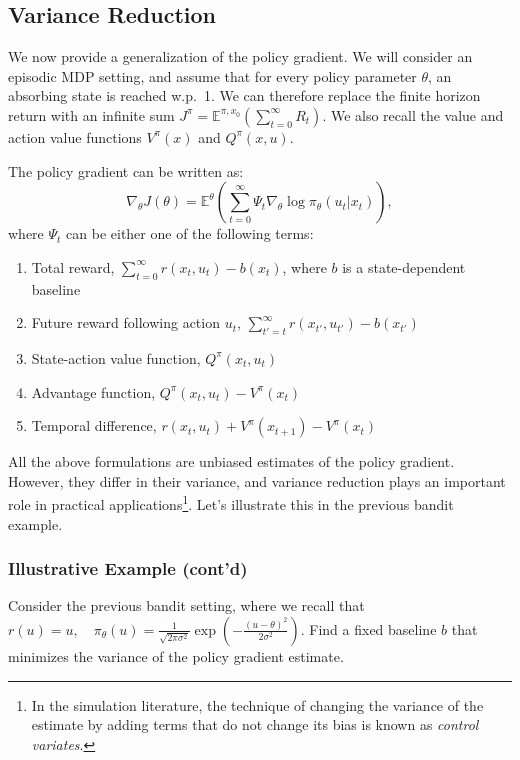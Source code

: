 \subsection{Variance Reduction}
We now provide a generalization of the policy gradient. We will consider an episodic MDP setting, and assume that for every policy parameter $\theta$, an absorbing state is reached w.p.~1. We can therefore replace the finite horizon return with an infinite sum ${J^\pi } = {\mathbb E^{\pi ,{x_0}}} \left(\sum\limits_{t = 0}^\infty {{R_t}} \right)$. We also recall the value and action value functions $V^\pi(x)$ and $Q^\pi(x,u)$. 
\begin{proposition}\label{prop:pg_control_variates}
The policy gradient can be written as:
\begin{equation*}
    \nabla_\theta J(\theta) = {\mathbb E^\theta }\left( \sum_{t=0}^\infty \Psi_t {{\nabla _\theta }\log {\pi _\theta }({u_t}|{x_t})} \right),
\end{equation*}
where $\Psi_t$ can be either one of the following terms:
\begin{enumerate}
    \item Total reward, $\sum_{t=0}^\infty r(x_t,u_t) - b(x_t)$, where $b$ is a state-dependent baseline
    \item Future reward following action $u_{t}$, $\sum_{t'=t}^\infty r(x_{t'},u_{t'}) - b(x_{t'})$
    \item State-action value function, $Q^\pi(x_t,u_t)$
    \item Advantage function, $Q^\pi(x_t,u_t) - V^\pi(x_t)$
    \item Temporal difference, $r(x_t,u_t) + V^\pi(x_{t+1})- V^\pi(x_t)$
\end{enumerate}
\end{proposition}

All the above formulations are unbiased estimates of the policy gradient. However, they differ in their variance, and variance reduction plays an important role in practical applications\footnote{In the simulation literature, the technique of changing the variance of the estimate by adding terms that do not change its bias is known as \textit{control variates}.}. Let's illustrate this in the previous bandit example.

\subsubsection{Illustrative Example (cont'd)}
Consider the previous bandit setting, where we recall that
$        r(u) = u, \quad
        \pi_\theta(u) = \frac{1}{\sqrt{2 \pi \sigma^2}} \exp (- \frac{(u - \theta)^2}{2 \sigma^2}).$
Find a fixed baseline $b$ that minimizes the variance of the policy gradient estimate.

